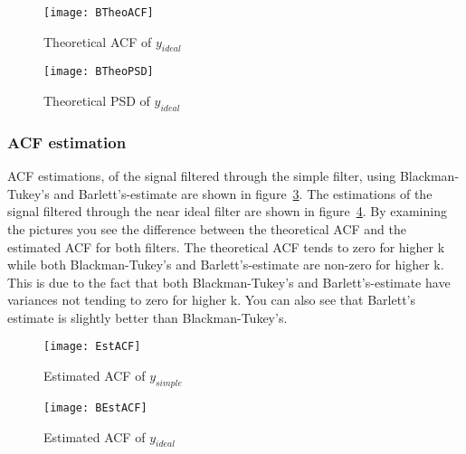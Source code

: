 \documentclass[10pt]{article}
\begin{document}
\begin{figure}[!hp]

    \begin{center}
      \texttt{[image: BTheoACF]}
    \caption{Theoretical ACF of $y_{ideal}$ \label{fig:TheoACFideal}}

    \end{center}

\end{figure}

\begin{figure}[!hp]

    \begin{center}
      \texttt{[image: BTheoPSD]}
    \caption{Theoretical PSD of $y_{ideal}$ \label{fig:TheoPSDideal}}
    \end{center}

\end{figure}

\clearpage

\subsubsection{ACF estimation}

ACF estimations, of the signal filtered through the simple filter, using Blackman-
Tukey’s and Barlett’s-estimate are shown in figure~\ref{fig:ACFest}. The estimations of the signal
filtered through the near ideal filter are shown in figure~\ref{fig:BACFest}.
By examining the pictures you see the difference between the theoretical ACF and
the estimated ACF for both filters. The theoretical ACF tends to zero for higher k
while both Blackman-Tukey’s and Barlett’s-estimate are non-zero for higher k. This is
due to the fact that both Blackman-Tukey’s and Barlett’s-estimate have variances not
tending to zero for higher k. You can also see that Barlett’s estimate is slightly better
than Blackman-Tukey’s. \\


\begin{figure}[!hp]

    \begin{center}
      \texttt{[image: EstACF]}
    \caption{Estimated ACF of $y_{simple}$ \label{fig:ACFest}}
    \end{center}

\end{figure}

\begin{figure}[!hp]

    \begin{center}
      \texttt{[image: BEstACF]}
    \caption{Estimated ACF of $y_{ideal}$ \label{fig:BACFest}}
    \end{center}

\end{figure}
\end{document}
